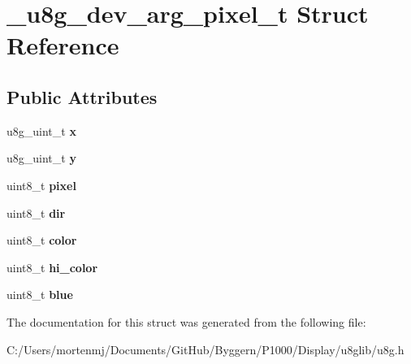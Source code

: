 \hypertarget{struct__u8g__dev__arg__pixel__t}{\section{\-\_\-u8g\-\_\-dev\-\_\-arg\-\_\-pixel\-\_\-t Struct Reference}
\label{struct__u8g__dev__arg__pixel__t}
}
\subsection*{Public Attributes}
\begin{DoxyCompactItemize}
\item 
\hypertarget{struct__u8g__dev__arg__pixel__t_af150fd56177399bc4c4d828b9b26e77f}{u8g\-\_\-uint\-\_\-t {\bfseries x}}\label{struct__u8g__dev__arg__pixel__t_af150fd56177399bc4c4d828b9b26e77f}

\item 
\hypertarget{struct__u8g__dev__arg__pixel__t_ad232cc68b60e6ff0c275e61d12cd86b6}{u8g\-\_\-uint\-\_\-t {\bfseries y}}\label{struct__u8g__dev__arg__pixel__t_ad232cc68b60e6ff0c275e61d12cd86b6}

\item 
\hypertarget{struct__u8g__dev__arg__pixel__t_a06d06e46dbc0ca4a5c910ac3e3fcadcb}{uint8\-\_\-t {\bfseries pixel}}\label{struct__u8g__dev__arg__pixel__t_a06d06e46dbc0ca4a5c910ac3e3fcadcb}

\item 
\hypertarget{struct__u8g__dev__arg__pixel__t_a10ff6d5d25e67eab51809319ec706f35}{uint8\-\_\-t {\bfseries dir}}\label{struct__u8g__dev__arg__pixel__t_a10ff6d5d25e67eab51809319ec706f35}

\item 
\hypertarget{struct__u8g__dev__arg__pixel__t_a5257572f8561b596737235b1496f77eb}{uint8\-\_\-t {\bfseries color}}\label{struct__u8g__dev__arg__pixel__t_a5257572f8561b596737235b1496f77eb}

\item 
\hypertarget{struct__u8g__dev__arg__pixel__t_a58303bcf281b98110440807a0688115a}{uint8\-\_\-t {\bfseries hi\-\_\-color}}\label{struct__u8g__dev__arg__pixel__t_a58303bcf281b98110440807a0688115a}

\item 
\hypertarget{struct__u8g__dev__arg__pixel__t_ad8af04b8556ba079a1349ba6202a29d7}{uint8\-\_\-t {\bfseries blue}}\label{struct__u8g__dev__arg__pixel__t_ad8af04b8556ba079a1349ba6202a29d7}

\end{DoxyCompactItemize}


The documentation for this struct was generated from the following file\-:\begin{DoxyCompactItemize}
\item 
C\-:/\-Users/mortenmj/\-Documents/\-Git\-Hub/\-Byggern/\-P1000/\-Display/u8glib/u8g.\-h\end{DoxyCompactItemize}
